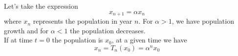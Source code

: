 Let's take the expression
$$
	x_{n+1} = \alpha x_n
$$
where $x_n$ represents the population in year $n$. For $\alpha > 1$, we have population growth and for $\alpha < 1$ the population decreases. \\
If at time $t=0$ the population is $x_0$, at a given time we have
$$
	x_n = T_n(x_0) = \alpha^n x_0
$$
